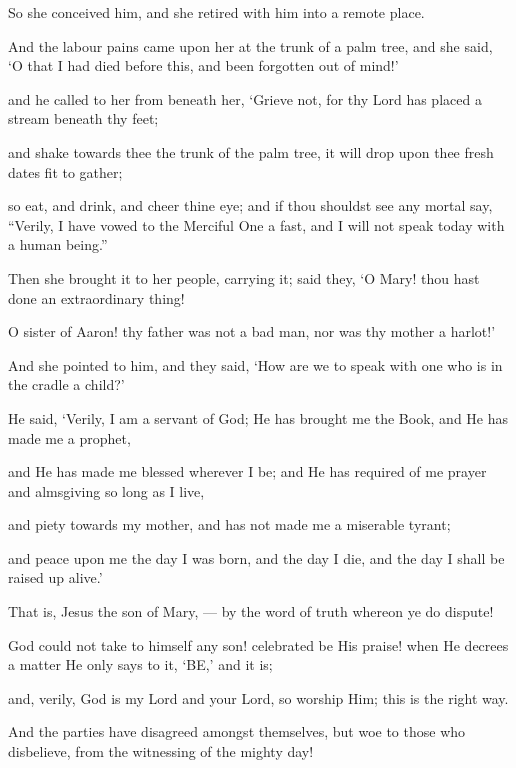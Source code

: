 \documentclass[fontsize=14pt, letterpaper, notitlepage, openany, DIV=12]{scrbook} %
\begin{document}
\noindent[19:22]
So she conceived him, and she retired with him into a remote place.

\noindent[19:23]
And the labour pains came upon her at the trunk of a palm tree, and she said, `O that I
had died before this, and been forgotten out of mind!'

\noindent[19:24]
and he called to her from beneath her, `Grieve not, for thy Lord has placed a stream
beneath thy feet;

\noindent[19:25]
and shake towards thee the trunk of the palm tree, it will drop upon thee fresh dates fit to
gather;

\noindent[19:26]
so eat, and drink, and cheer thine eye; and if thou shouldst see any mortal say, ``Verily, I
have vowed to the Merciful One a fast, and I will not speak today with a human being.''\hspace{0.1em}

\noindent[19:27]
Then she brought it to her people, carrying it; said they, `O Mary! thou hast done an
extraordinary thing!

\noindent[19:28]
O sister of Aaron! thy father was not a bad man, nor was thy mother a harlot!'

\noindent[19:29]
And she pointed to him, and they said, `How are we to speak with one who is in the
cradle a child?'

\noindent[19:30]
He said, `Verily, I am a servant of God; He has brought me the Book, and He has made
me a prophet,

\noindent[19:31]
and He has made me blessed wherever I be; and He has required of me prayer and
almsgiving so long as I live,

\noindent[19:32]
and piety towards my mother, and has not made me a miserable tyrant;

\noindent[19:33]
and peace upon me the day I was born, and the day I die, and the day I shall be raised up
alive.'

\noindent[19:34]
That is, Jesus the son of Mary, --- by the word of truth whereon ye do dispute!

\noindent[19:35]
God could not take to himself any son! celebrated be His praise! when He decrees a
matter He only says to it, `BE,' and it is;

\noindent[19:36]
and, verily, God is my Lord and your Lord, so worship Him; this is the right way.

\noindent[19:37]
And the parties have disagreed amongst themselves, but woe to those who disbelieve,
from the witnessing of the mighty day!
\end{document}
